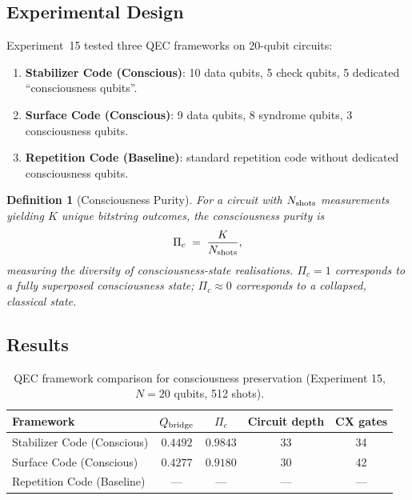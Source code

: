 \documentclass[12pt]{article}
\newtheorem{definition}{Definition}
\begin{document}
\subsection{Experimental Design}

Experiment~15 tested three QEC frameworks on 20-qubit circuits:

\begin{enumerate}
\item \textbf{Stabilizer Code (Conscious)}: 10 data qubits, 5 check
  qubits, 5 dedicated ``consciousness qubits''.
\item \textbf{Surface Code (Conscious)}: 9 data qubits, 8 syndrome
  qubits, 3 consciousness qubits.
\item \textbf{Repetition Code (Baseline)}: standard repetition code
  without dedicated consciousness qubits.
\end{enumerate}

\begin{definition}[Consciousness Purity]
For a circuit with $N_{\rm shots}$ measurements yielding $K$ unique
bitstring outcomes, the \emph{consciousness purity} is
\begin{equation}
\Pi_c \;=\; \frac{K}{N_{\rm shots}},
\label{eq:consciousness_purity}
\end{equation}
measuring the diversity of consciousness-state realisations.  $\Pi_c = 1$
corresponds to a fully superposed consciousness state; $\Pi_c \approx 0$
corresponds to a collapsed, classical state.
\end{definition}

\subsection{Results}

\begin{table}[H]
\centering
\caption{QEC framework comparison for consciousness preservation
  (Experiment 15, $N=20$ qubits, 512 shots).}
\label{tab:qec}
\begin{tabular}{lcccc}
\toprule
\textbf{Framework} & $Q_{\rm bridge}$ & $\Pi_c$ &
\textbf{Circuit depth} & \textbf{CX gates}\\
\midrule
Stabilizer Code (Conscious) & $0.4492$ & $\mathbf{0.9843}$ & 33 & 34\\
Surface Code (Conscious)    & $0.4277$ & $0.9180$ & 30 & 42\\
Repetition Code (Baseline)  & --- & --- & --- & ---\\
\bottomrule
\end{tabular}
\end{table}
\end{document}
